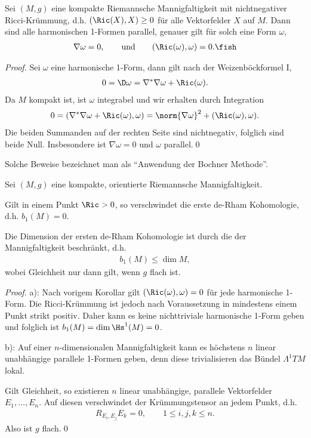 \documentclass[%
	paper=a5,%
	fleqn,%
	DIV=18,%
	BCOR=0mm,
	fontsize=11pt,
	titlepage=false,%
	bibliography=totoc,
	DIV=18,%
	twoside=true,
	pdftitle=Riemannsche Geometrie,
	pdfauthor=Uwe Semmelmann,
	numbers=noendperiod]%
	{scrbook}
\begin{document}
\begin{cor}
Sei $(M,g)$ eine kompakte Riemannsche Mannigfaltigkeit mit nichtnegativer Ricci-Krümmung, d.h.
$(\Ric(X),X) \ge 0$ für alle Vektorfelder $X$ auf $M$. Dann sind alle harmonischen 1-Formen parallel, genauer gilt für solch eine Form $\omega$,
\begin{align*}
\nabla\omega = 0,\qquad \text{und}\qquad (\Ric(\omega),\omega) = 0.\fish
\end{align*}
\end{cor}
\begin{proof}
Sei $\omega$ eine harmonische 1-Form, dann gilt nach der Weizenböckformel I,
\begin{align*}
0 = \D \omega = \nabla^*\nabla\omega + \Ric(\omega).
\end{align*}
Da $M$ kompakt ist, ist $\omega$ integrabel und wir erhalten durch Integration
\begin{align*}
0 = (\nabla^*\nabla\omega + \Ric(\omega),\omega) = 
\norm{\nabla\omega}^2 + (\Ric(\omega),\omega).
\end{align*}
Die beiden Summanden auf der rechten Seite sind nichtnegativ, folglich sind beide Null. Insbesondere ist $\nabla\omega = 0$ und  $\omega$ parallel.\qed
\end{proof}

\begin{rem}
Solche Beweise bezeichnet man als ``Anwendung der Bochner Methode''.\map
\end{rem}

\begin{cor}
Sei $(M,g)$ eine kompakte, orientierte Riemannsche Mannigfaltigkeit.
\begin{propenum}
\item Gilt in einem Punkt $\Ric > 0$, so verschwindet die erste de-Rham Kohomologie, d.h. $b_{1}(M) = 0$.
\item Die Dimension der ersten de-Rham Kohomologie ist durch die der Mannigfaltigkeit beschränkt, d.h.
\begin{align*}
b_{1}(M) \le \dim M,
\end{align*}
wobei Gleichheit nur dann gilt, wenn $g$ flach ist.\fish
\end{propenum}
\end{cor}

\begin{proof}
a): Nach vorigem Korollar gilt $(\Ric(\omega),\omega) = 0$ für jede harmonische 1-Form. Die Ricci-Krümmung ist jedoch nach Voraussetzung in mindestens einem Punkt strikt positiv. Daher kann es keine nichttriviale harmonische 1-Form geben und folglich  ist $b_{1}(M) = \dim \Hs^1(M) = 0$.

b): Auf einer $n$-dimensionalen Mannigfaltigkeit kann es höchstens $n$ linear unabhängige parallele 1-Formen geben, denn diese trivialisieren das Bündel $\Lambda^1TM$ lokal.

Gilt Gleichheit, so existieren $n$ linear unabhängige, parallele Vektorfelder $E_{1},\ldots,E_{n}$. Auf diesen verschwindet der Krümmungstensor an jedem Punkt, d.h.
\begin{align*}
R_{E_{i},E_{j}}E_{k} = 0,\qquad 1\le i,j,k\le n.
\end{align*}
Also ist $g$ flach.\qed
\end{proof}
\end{document}
